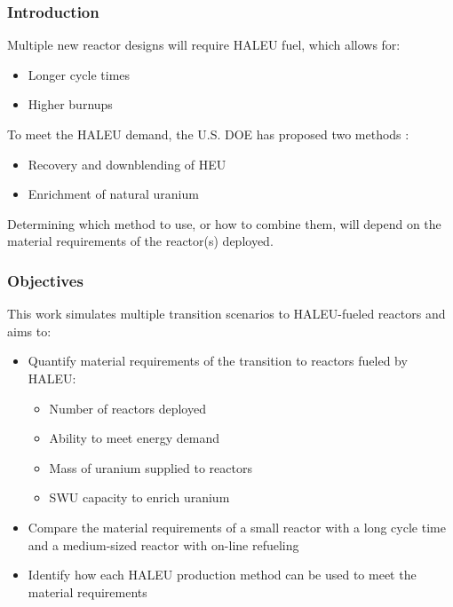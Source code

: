 \begin{frame}
    \frametitle{Introduction}
    Multiple new reactor designs will require \gls{HALEU} fuel, which allows for: 
    \begin{itemize}
        \item Longer cycle times
        \item Higher burnups 
    \end{itemize}
    To meet the \gls{HALEU} demand, the U.S. \gls{DOE} has proposed two methods
    \cite{griffith_overview_2020}:
    \begin{itemize}
        \item Recovery and downblending of \gls{HEU}
        \item Enrichment of natural uranium
    \end{itemize}
    Determining which method to use, or how to combine them, will depend on 
    the material requirements of the reactor(s) deployed.

\end{frame}

\begin{frame}
    \frametitle{Objectives}
    This work simulates multiple transition scenarios to \gls{HALEU}-fueled 
    reactors and aims to:
    \begin{itemize}
        \item Quantify material requirements of the transition to reactors 
              fueled by \gls{HALEU}:
              \begin{itemize}
                  \item Number of reactors deployed 
                  \item Ability to meet energy demand
                  \item Mass of uranium supplied to reactors
                  \item \gls{SWU} capacity to enrich uranium
              \end{itemize}
        \item Compare the material requirements of a small reactor with a long cycle 
              time and a medium-sized reactor with on-line refueling
        \item Identify how each \gls{HALEU} production method can be used to 
              meet the material requirements
    \end{itemize}
\end{frame}